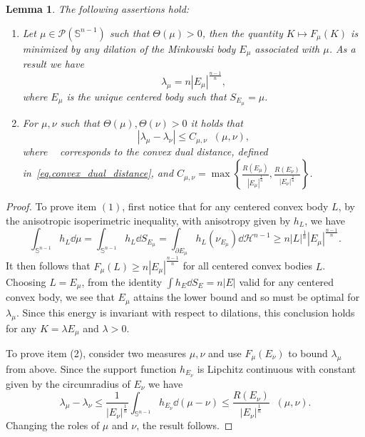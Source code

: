 \documentclass[a4paper, 10pt, twoside]{amsart}
\numberwithin{equation}{section}
\newcommand{\lemmname}{Lemma}
\theoremstyle{plain}
\newtheorem{lemma}[theorem]{\lemmname}
\theoremstyle{definition}
\DeclareMathOperator{\dc}{\mathrm{d}_\mathrm{C}}
\begin{document}
\begin{lemma}\label{lemma.variational_problem}
    The following assertions hold: 
    \begin{enumerate}
        \item Let $\mu \in \mathscr{P}(\mathbb{S}^{n-1})$ such that $\Theta(\mu) > 0$, then the quantity $K \mapsto F_\mu(K)$ is minimized by any dilation of the Minkowski body $E_\mu$ associated with $\mu$. As a result we have 
        \[
            \lambda_\mu = n {|E_\mu|}^{\frac{n-1}{n}}, 
        \]
        where $E_\mu$ is the unique centered body such that $S_{E_\mu} = \mu$.
        \item For $\mu,\nu$ such that $\Theta(\mu),\Theta(\nu) > 0$ it holds that 
        \[
            |\lambda_\mu - \lambda_\nu| 
            \le 
            C_{\mu,\nu} \dc(\mu,\nu),
        \]
        where $\dc$ corresponds to the convex dual distance, defined in~\eqref{eq.convex_dual_distance}, and $C_{\mu,\nu} =  \max\left\{\frac{R(E_\mu)}{|E_\mu|^{\frac{1}{n}}}, \frac{R(E_\nu)}{|E_\nu|^{\frac{1}{n}}}  \right\}$. 
    \end{enumerate}
\end{lemma}
\begin{proof}
    To prove item $(1)$, first notice that for any centered convex body $L$, by the anisotropic isoperimetric inequality, with anisotropy given by $h_L$, we have 
    \[
        \int_{\mathbb{S}^{n-1}} h_L \dd \mu 
        = 
        \int_{\mathbb{S}^{n-1}} h_L \dd S_{E_\mu} 
        = 
        \int_{\partial E_\mu} h_L(\nu_{E_\mu}) \dd \mathcal{H}^{n-1} 
        \ge 
        n{|L|}^{\frac{1}{n}} {|E_\mu|}^{\frac{n-1}{n}}. 
    \]
    It then follows that $F_\mu(L) \ge n|E_\mu|^{\frac{n-1}{n}}$ for all centered convex bodies $L$. Choosing $L = E_\mu$, from the identity $\int h_E \dd S_E = n|E|$ valid for any centered convex body, we see that $E_\mu$ attains the lower bound and so must be optimal for $\lambda_\mu$. Since this energy is invariant with respect to dilations, this conclusion holds for any $K = \lambda E_\mu$ and $\lambda > 0$. 
    
    To prove item (2), consider two measures $\mu,\nu$ and use $F_\mu(E_\nu)$ to bound $\lambda_\mu$ from above. Since the support function $h_{E_\nu}$ is Lipchitz continuous with constant given by the circumradius of $E_\nu$ we have 
    \[
        \lambda_\mu - \lambda_\nu 
        \le 
        \frac{1}{|E_\nu|^{\frac{1}{n}}} 
        \int_{\mathbb{S}^{n-1}} h_{E_\nu} \dd (\mu - \nu)
        \le 
        \frac{R(E_\nu)}{|E_\nu|^{\frac{1}{n}}} \dc(\mu,\nu). 
    \]
    Changing the roles of $\mu$ and $\nu$, the result follows. 
\end{proof}
\end{document}
